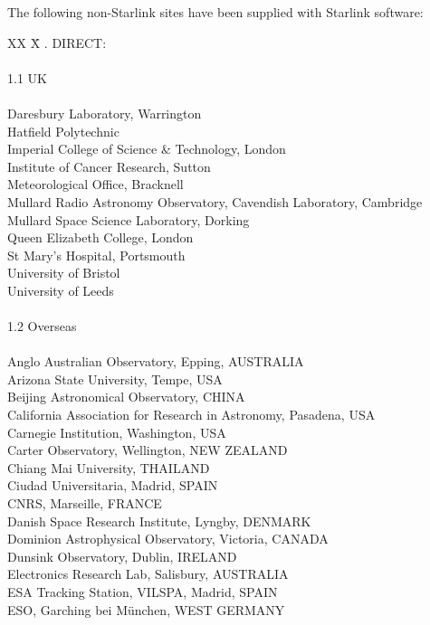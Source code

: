 The following non-Starlink sites have been supplied with Starlink software:
\begin{tabbing}
XX \=X . DIRECT:\\
\\
1.1 UK\\
\\
\>Daresbury Laboratory, Warrington\\
\>Hatfield Polytechnic\\
\>Imperial College of Science \& Technology, London\\
\>Institute of Cancer Research, Sutton\\
\>Meteorological Office, Bracknell\\
\>Mullard Radio Astronomy Observatory, Cavendish Laboratory, Cambridge\\
\>Mullard Space Science Laboratory, Dorking\\
\>Queen Elizabeth College, London\\
\>St Mary's Hospital, Portsmouth\\
\>University of Bristol\\
\>University of Leeds\\
\\
1.2 Overseas\\
\\
\>Anglo Australian Observatory, Epping, AUSTRALIA\\
\>Arizona State University, Tempe, USA\\
\>Beijing Astronomical Observatory, CHINA\\
\>California Association for Research in Astronomy, Pasadena, USA\\
\>Carnegie Institution, Washington, USA\\
\>Carter Observatory, Wellington, NEW ZEALAND\\
\>Chiang Mai University, THAILAND\\
\>Ciudad Universitaria, Madrid, SPAIN\\
\>CNRS, Marseille, FRANCE\\
\>Danish Space Research Institute, Lyngby, DENMARK\\
\>Dominion Astrophysical Observatory, Victoria, CANADA\\
\>Dunsink Observatory, Dublin, IRELAND\\
\>Electronics Research Lab, Salisbury, AUSTRALIA\\
\>ESA Tracking Station, VILSPA, Madrid, SPAIN\\
\>ESO, Garching bei M\"{u}nchen, WEST GERMANY\\

\end{tabbing}

